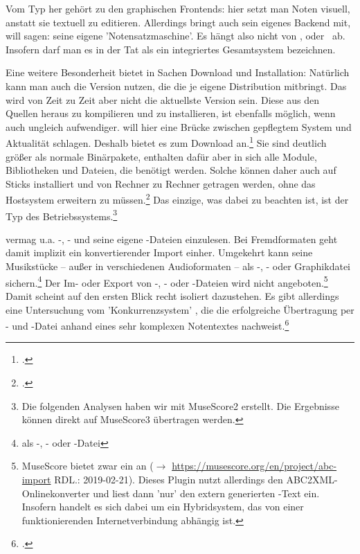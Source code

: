Vom Typ her gehört  zu den graphischen Frontends:
hier setzt man Noten visuell, anstatt sie textuell zu editieren. Allerdings
bringt  auch sein eigenes Backend mit, will sagen: seine eigene
'Notensatzmaschine'. Es hängt also nicht von ,  oder
\ ab. Insofern darf man es in der Tat als ein integriertes
Gesamtsystem bezeichnen.

Eine weitere Besonderheit bietet  in Sachen Download und
Installation: Natürlich kann man auch die Version nutzen, die die je eigene
Distribution mitbringt. Das wird von Zeit zu Zeit aber nicht die aktuellste
Version sein. Diese aus den Quellen heraus zu kompilieren und zu installieren,
ist ebenfalls möglich, wenn auch ungleich aufwendiger.  will hier
eine Brücke zwischen gepflegtem System und Aktualität schlagen. Deshalb bietet
es  zum Download an.\footcite[vgl.][\nopage wp]{MuseScore2019b}
Sie sind deutlich größer als normale Binärpakete, enthalten dafür aber in sich
alle Module, Bibliotheken und Dateien, die benötigt werden.
Solche  können daher auch auf Sticks installiert und von Rechner
zu Rechner getragen werden, ohne das Hostsystem erweitern zu
müssen.\footcite[vgl. dazu][\nopage wp]{Prakash2018a} Das einzige, was dabei zu
beachten ist, ist der Typ des Betriebssystems.\footnote{Die folgenden Analysen
haben wir mit MuseScore2 erstellt. Die Ergebnisse können direkt auf MuseScore3
übertragen werden.}

 vermag u.a. -, - und seine eigene
-Dateien einzulesen. Bei Fremdformaten geht damit implizit ein
konvertierender Import einher. Umgekehrt kann  seine Musikstücke
-- außer in verschiedenen Audioformaten -- als -, - oder
Graphikdatei sichern.\footnote{als -, - oder -Datei}
Der Im- oder Export von -, - oder -Dateien
wird nicht angeboten.\footnote{MuseScore bietet zwar ein 
an ($\rightarrow$ \href{https://musescore.org/en/project/abc-import}
{https://musescore.org/en/project/abc-import} RDL.: 2019-02-21). Dieses Plugin
nutzt allerdings den ABC2XML-Onlinekonverter und liest dann 'nur' den extern
generierten -Text ein. Insofern handelt es sich dabei um ein
Hybridsystem, das von einer funktionierenden Internetverbindung abhängig ist.}
Damit scheint  auf den ersten Blick recht isoliert dazustehen. Es
gibt allerdings eine Untersuchung vom 'Konkurrenzsystem' , die die
erfolgreiche Übertragung per - und -Datei anhand eines
sehr komplexen Notentextes nachweist.\footcite[vgl.][\nopage wp]{Denemo2019a}

